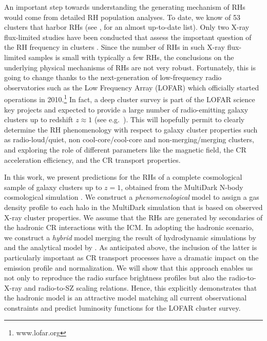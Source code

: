 \documentclass[traditabstract]{aa}
\begin{document}
An important step towards understanding the generating mechanism of RHs would
come from detailed RH population analyses. To date, we know of 53 clusters
that harbor RHs (see \citealp{2012A&ARv..20...54F}, for an almost up-to-date
list). Only two X-ray flux-limited studies have been conducted that assess the
important question of the RH frequency in clusters \citep{1999NewA....4..141G,
  VenturiGMRT_2}. Since the number of RHs in such X-ray flux-limited samples is
small with typically a few RHs, the conclusions on the underlying physical
mechanisms of RHs are not very robust. Fortunately, this is going to change
thanks to the next-generation of low-frequency radio observatories such as the
Low Frequency Array (LOFAR) which officially started operations in
2010.\footnote{www.lofar.org} In fact, a deep cluster survey is part of the
LOFAR science key projects and expected to provide a large number of
radio-emitting galaxy clusters up to redshift $z\approx1$ (see
e.g.~\citealp{2010A&A...509A..68C,2012JApA..tmp...34R}).  This will hopefully
permit to clearly determine the RH phenomenology with respect to galaxy cluster
properties such as radio-loud/quiet, non cool-core/cool-core and
non-merging/merging clusters, and exploring the role of different parameters
like the magnetic field, the CR acceleration efficiency, and the CR transport
properties.

In this work, we present predictions for the RHs of a complete cosmological
sample of galaxy clusters up to $z= 1$, obtained from the MultiDark N-body
cosmological simulation \citep{2011arXiv1104.5130P}. We construct a
\emph{phenomenological} model to assign a gas density profile to each halo in
the MultiDark simulation that is based on observed X-ray cluster properties. We
assume that the RHs are generated by secondaries of the hadronic CR interactions
with the ICM. In adopting the hadronic scenario, we construct a \emph{hybrid}
model merging the result of hydrodynamic simulations by
\cite{2010MNRAS.409..449P} and the analytical model by
\cite{2011A&A...527A..99E}.  As anticipated above, the inclusion of the latter
is particularly important as CR transport processes have a dramatic impact on
the emission profile and normalization. We will show that this approach enables
us not only to reproduce the radio surface brightness profiles but also the
radio-to-X-ray and radio-to-SZ scaling relations. Hence, this explicitly
demonstrates that the hadronic model is an attractive model matching all current
observational constraints and predict luminosity functions for the LOFAR cluster
survey.
\end{document}
